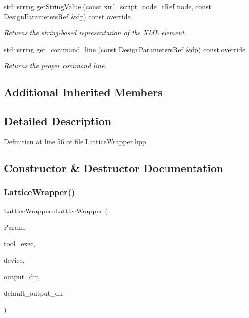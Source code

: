 \begin{DoxyCompactItemize}
std\+::string \hyperlink{classLatticeWrapper_a93a496eef88f096b8405503966a15a2d}{get\+String\+Value} (const \hyperlink{xml__script__command_8hpp_a1fe3d50ade66bc35e41be9b68bbbcd02}{xml\+\_\+script\+\_\+node\+\_\+t\+Ref} node, const \hyperlink{DesignParameters_8hpp_ae36bb1c4c9150d0eeecfe1f96f42d157}{Design\+Parameters\+Ref} \&dp) const override
\begin{DoxyCompactList}\small\item\em Returns the string-\/based representation of the X\+ML element. \end{DoxyCompactList}\item 
std\+::string \hyperlink{classLatticeWrapper_ae568633c4a822e32b6ca75f9c12bf141}{get\+\_\+command\+\_\+line} (const \hyperlink{DesignParameters_8hpp_ae36bb1c4c9150d0eeecfe1f96f42d157}{Design\+Parameters\+Ref} \&dp) const override
\begin{DoxyCompactList}\small\item\em Returns the proper command line. \end{DoxyCompactList}\end{DoxyCompactItemize}
\subsection*{Additional Inherited Members}


\subsection{Detailed Description}


Definition at line 56 of file Lattice\+Wrapper.\+hpp.



\subsection{Constructor \& Destructor Documentation}
\mbox{\label{classLatticeWrapper_a4321338d396a4bdaa08cde45edb5d42a}} 
\subsubsection{\texorpdfstring{Lattice\+Wrapper()}{LatticeWrapper()}}
{\footnotesize\ttfamily Lattice\+Wrapper\+::\+Lattice\+Wrapper (\begin{DoxyParamCaption}\item[{const \hyperlink{Parameter_8hpp_a37841774a6fcb479b597fdf8955eb4ea}{Parameter\+Const\+Ref} \&}]{Param,  }\item[{const std\+::string \&}]{tool\+\_\+exec,  }\item[{const \hyperlink{target__device_8hpp_acedb2b7a617e27e6354a8049fee44eda}{target\+\_\+device\+Ref} \&}]{device,  }\item[{const std\+::string \&}]{output\+\_\+dir,  }\item[{const std\+::string \&}]{default\+\_\+output\+\_\+dir }\end{DoxyParamCaption})}



